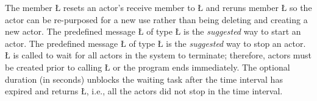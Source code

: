 \documentclass[openright,twoside]{report}
\begin{document}
The member \LGinlinetrue\LGbegin\lgrinde\L{}\endlgrinde\LGend{} resets an actor's receive member to \LGinlinetrue\LGbegin\lgrinde\L{}\endlgrinde\LGend{} and reruns member \LGinlinetrue\LGbegin\lgrinde\L{}\endlgrinde\LGend{} so the actor can be re-purposed for a new use rather than being deleting and creating a new actor.
The predefined message \LGinlinetrue\LGbegin\lgrinde\L{}\endlgrinde\LGend{} of type \LGinlinetrue\LGbegin\lgrinde\L{}\endlgrinde\LGend{} is the \emph{suggested} way to start an actor.
The predefined message \LGinlinetrue\LGbegin\lgrinde\L{}\endlgrinde\LGend{} of type \LGinlinetrue\LGbegin\lgrinde\L{}\endlgrinde\LGend{} is the \emph{suggested} way to stop an actor.
\LGinlinetrue\LGbegin\lgrinde\L{}\endlgrinde\LGend{} is called to wait for all actors in the system to terminate;
therefore, actors must be created prior to calling \LGinlinetrue\LGbegin\lgrinde\L{}\endlgrinde\LGend{} or the program ends immediately.
The optional duration (in seconds) unblocks the waiting task after the time interval has expired and returns \LGinlinetrue\LGbegin\lgrinde\L{}\endlgrinde\LGend{}, i.e., all the actors did not stop in the time interval.
\end{document}
